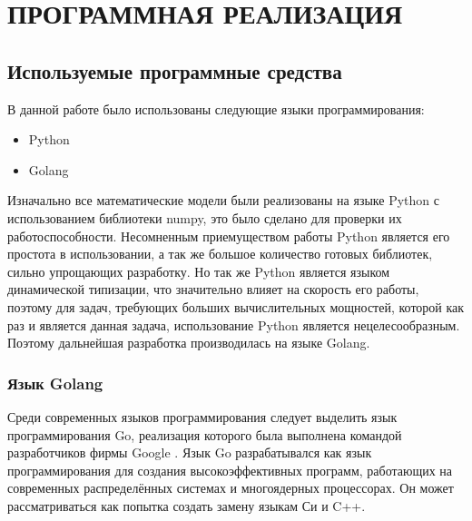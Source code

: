 \chapter{ПРОГРАММНАЯ РЕАЛИЗАЦИЯ}
\section{Используемые программные средства}

В данной работе было использованы следующие языки программирования:
\begin{itemize}
    \item Python
    \item Golang
\end{itemize}

Изначально все математические модели были реализованы на языке Python с использованием библиотеки numpy, это было сделано для проверки их работоспособности. Несомненным приемуществом работы Python является его простота в использовании, а так же большое количество готовых библиотек, сильно 
упрощающих разработку. Но так же Python является языком динамической типизации, что значительно влияет на скорость его работы, поэтому для задач,
требующих больших вычислительных мощностей, которой как раз и является данная задача, использование Python является нецелесообразным. Поэтому дальнейшая
разработка производилась на языке Golang.

\subsection*{Язык Golang}

Среди современных языков программирования следует выделить язык программирования Go, реализация которого была выполнена командой разработчиков фирмы Google \cite{GoTour}. Язык Go разрабатывался как язык программирования для создания высокоэффективных программ, работающих на современных распределённых системах и многоядерных процессорах. Он может рассматриваться как попытка создать замену языкам Си и C++. 

